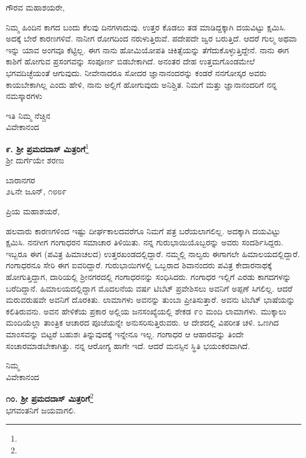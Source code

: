 \noindent
ಗೌರವ ಮಹಾಶಯರೇ,

ನಿಮ್ಮ ಹಿಂದಿನ ಕಾಗದ ಬಂದು ಕೆಲವು ದಿನಗಳಾದುವು. ಉತ್ತರ ಕೊಡಲು ತಡ ಮಾಡಿದ್ದಕ್ಕಾಗಿ ದಯವಿಟ್ಟು ಕ್ಷಮಿಸಿ. ಅದಕ್ಕೆ ಬೇರೆ ಕಾರಣಗಳಿವೆ. ನಾನೀಗ ರೋಗದಿಂದ ನರುಳುತ್ತಿರುವೆ. ಪದೇಪದೇ ಜ್ವರ ಬರುತ್ತಿದೆ. ಆದರೆ ಗುಲ್ಮ ಅಥವಾ ಇನ್ನು ಯಾವ ಅಂಗವೂ ಕೆಟ್ಟಿಲ್ಲ. ಈಗ ನಾನು ಹೋಮಿಯೋಪತಿ ಚಿಕಿತ್ಸೆಯನ್ನು ತೆಗೆದುಕೊಳ್ಳುತ್ತಿದ್ದೇನೆ. ನಾನು ಈಗ ಕಾಶಿಗೆ ಹೋಗುವ ಪ್ರಸಂಗವನ್ನು ಸಂಪೂರ್ಣ ಬಿಡಬೇಕಾಗಿದೆ. ಅನಂತರ ದೇಹ ಉತ್ತಮಗೊಂಡಮೇಲೆ ಭಗವದಿಚ್ಛೆಯಂತೆ ಆಗುವುದು. ನೀವೇನಾದರೂ ಸೋದರ ಜ್ಞಾನಾನಂದರನ್ನು ಕಂಡರೆ ನನಗೋಸ್ಕರ ಅವರು ಕಾಯಬೇಕಾಗಿಲ್ಲ ಎಂದು ಹೇಳಿ, ನಾನು ಅಲ್ಲಿಗೆ ಹೋಗುವುದು ಅನಿಶ್ಚಿತ. ನಿಮಗೆ ಮತ್ತು ಜ್ಞಾನಾನಂದರಿಗೆ ನನ್ನ ನಮಸ್ಕಾರಗಳು

{\flushright
ಇತಿ ನಿಮ್ಮ ನೆಚ್ಚಿನ\\ವಿವೇಕಾನಂದ\par}

\begin{center}
\textbf{೯. ಶ‍್ರೀ ಪ್ರಮದದಾಸ್ ಮಿತ್ರರಿಗೆ}\footnote{}\\ ಶ‍್ರೀ ದುರ್ಗೆಯೇ ಶರಣು
\end{center}

\begin{flushright}
ಬಾರಾನಗರ\\೨೬ನೇ ಜೂನ್, ೧೮೮೯
\end{flushright}

\noindent
ಪ್ರಿಯ ಮಹಾಶಯರೆ,

ಹಲವಾರು ಕಾರಣಗಳಿಂದ ಇಷ್ಟು ದೀರ್ಘಕಾಲದವರೆಗೂ ನಿಮಗೆ ಪತ್ರ ಬರೆಯಲಾಗಲಿಲ್ಲ. ಅದಕ್ಕಾಗಿ ದಯವಿಟ್ಟು ಕ್ಷಮಿಸಿ. ನನಗೀಗ ಗಂಗಾಧರನ ಸಮಾಚಾರ ತಿಳಿಯಿತು. ನನ್ನ ಗುರುಭಾಯಿಯೊಬ್ಬರನ್ನು ಅವರು ಸಂದರ್ಶಿಸಿದ್ದರು. ಇಬ್ಬರೂ ಈಗ (ಪವಿತ್ರ ಹಿಮಾಚಲದ) ಉತ್ತರಖಂಡದಲ್ಲಿದ್ದಾರೆ. ನಮ್ಮಲ್ಲಿ ನಾಲ್ವರು ಈಗಾಗಲೇ ಹಿಮಾಲಯದಲ್ಲಿದ್ದಾರೆ. ಗಂಗಾಧರನೂ ಸೇರಿ ಈಗ ಐವರಿದ್ದಾರೆ. ಗುರುಭಾಯಿಗಳಲ್ಲಿ ಒಬ್ಬರಾದ ಶಿವಾನಂದರು ಪವಿತ್ರ ಕೇದಾರನಾಥಕ್ಕೆ ಹೋಗುತ್ತಿದ್ದಾಗ, ದಾರಿಯಲ್ಲಿ ಶ‍್ರೀನಗರದಲ್ಲಿ ಗಂಗಾಧರನನ್ನು ಸಂಧಿಸಿದರು. ಗಂಗಾಧರ ಇಲ್ಲಿಗೆ ಎರಡು ಕಾಗದಗಳನ್ನು ಬರೆದಿದ್ದಾನೆ. ಹಿಮಾಲಯದಲ್ಲಿದ್ದಾಗ ಮೊದಲನೆಯ ವರ್ಷ ಟಿಬೆಟ್ ಪ್ರವೇಶಿಸಲು ಅವನಿಗೆ ಅಪ್ಪಣೆ ಸಿಗಲಿಲ್ಲ. ಆದರೆ ಮರುವರುಷವೇ ಅವನಿಗೆ ದೊರಕಿತು. ಲಾಮಾಗಳು ಅವನನ್ನು ತುಂಬಾ ಪ್ರೀತಿಸುತ್ತಾರೆ. ಅವನು ಟಿಬೆಟ್ ಭಾಷೆಯನ್ನು ಕಲಿತಿರುವನು. ಅವನ ಹೇಳಿಕೆಯ ಪ್ರಕಾರ ಅಲ್ಲಿಯ ಜನಸಂಖ್ಯೆಯಲ್ಲಿ ಶೇಕಡ ೯೦ ಮಂದಿ ಲಾಮಾಗಳು. ಮುಕ್ಕಾಲು ಮಂದಿಯೆಲ್ಲಾ ತಾಂತ್ರಿಕ ಆಚಾರದ ಪೂಜೆಯನ್ನೇ ಅನುಸರಿಸುತ್ತಿರುವರು. ಆ ದೇಶದಲ್ಲಿ ವಿಪರೀತ ಚಳಿ. ಒಣಗಿದ ಮಾಂಸವನ್ನು ಬಿಟ್ಟರೆ ಬಹುಶಃ ತಿನ್ನುವುದಕ್ಕೆ ಇನ್ನೇನೂ ಇಲ್ಲ. ಗಂಗಾಧರ ಆ ಆಹಾರವನ್ನು ತಿಂದೇ ಸಂಚಾರಮಾಡಬೇಕಾಗಿತ್ತು. ನನ್ನ ಆರೋಗ್ಯ ಹಾಗೇ ಇದೆ. ಆದರೆ ಮನಸ್ಸಿನ ಸ್ಥಿತಿ ಭಯಂಕರವಾಗಿದೆ.

{\flushright
ನಿಮ್ಮ\\ವಿವೇಕಾನಂದ\par}

\begin{center}
\textbf{೧೦. ಶ‍್ರೀ ಪ್ರಮದದಾಸ್ ಮಿತ್ರರಿಗೆ}\footnote{}\\ ಭಗವಂತನಿಗೆ ಜಯವಾಗಲಿ.
\end{center}

